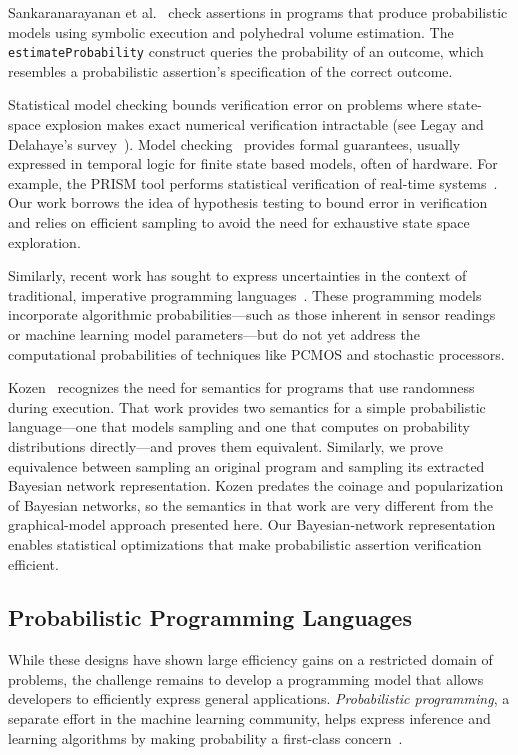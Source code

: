 Sankaranarayanan et al.~\cite{sriram-pldi} check assertions in
programs that produce probabilistic models using symbolic execution
and polyhedral volume estimation. The \texttt{estimateProbability} construct
queries the probability of an outcome, which resembles a probabilistic
assertion's
specification of the correct outcome.

Statistical model checking bounds verification error on 
problems where state-space explosion makes exact numerical
verification intractable (see Legay and Delahaye's
survey~\cite{legay10}).  Model checking~\cite{Clarke} provides formal guarantees,
usually expressed in temporal logic for finite state
based models, often of hardware. For example, the
PRISM tool performs statistical verification of real-time
systems~\cite{KNP11}. Our work borrows the idea of hypothesis
testing to bound error in verification~\cite{Younes,Younes20061368}
and
relies on efficient sampling to avoid
the need for exhaustive state space exploration.

Similarly, recent work has sought to express
uncertainties in the context of traditional, imperative programming
languages~\cite{uncertaint}. These programming models incorporate algorithmic
probabilities---such as those inherent in sensor readings or machine learning
model parameters---but do not yet address the computational probabilities of
techniques like PCMOS and stochastic processors.

Kozen~\cite{kozen} recognizes the need for semantics for programs
that use randomness during execution.
That work provides two semantics for a simple probabilistic
language---one that models sampling and one that computes on probability
distributions directly---and proves them equivalent.
Similarly, we prove equivalence between sampling an original program and
sampling its extracted Bayesian network representation.
Kozen predates the coinage and popularization of Bayesian networks, so
the semantics in that work are very different from the graphical-model approach
presented here.
Our Bayesian-network representation enables statistical optimizations that
make probabilistic assertion verification efficient.

\subsection{Probabilistic Programming Languages}

While these designs have shown large efficiency gains on a restricted domain
of problems, the challenge remains to develop a programming model that allows
developers to efficiently express general applications. \emph{Probabilistic
programming}, a separate effort in the machine learning community, helps
express inference and learning algorithms by making probability a first-class
concern~\cite{church}.

